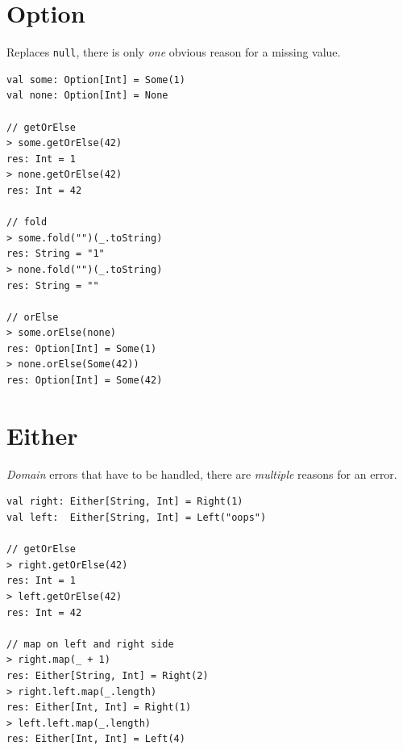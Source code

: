 \documentclass[10pt,landscape,a4paper]{article}
\begin{document}
\begin{multicols*}{4}
  \section{Option}
  \begin{mdframed}
    \footnotesize
    Replaces \texttt{null}, there is only \textit{one} obvious
    reason for a missing value.
  \end{mdframed}
  \begin{center}
  \end{center}
\begin{verbatim}
val some: Option[Int] = Some(1)
val none: Option[Int] = None

// getOrElse
> some.getOrElse(42)
res: Int = 1
> none.getOrElse(42)
res: Int = 42

// fold
> some.fold("")(_.toString)
res: String = "1"
> none.fold("")(_.toString)
res: String = ""

// orElse
> some.orElse(none)
res: Option[Int] = Some(1)
> none.orElse(Some(42))
res: Option[Int] = Some(42)

\end{verbatim}
  \section{Either}
  \begin{mdframed}
    \footnotesize
    \textit{Domain} errors that have to be handled, there are
    \textit{multiple} reasons for an error.
  \end{mdframed}
  \begin{center}
  \end{center}
\begin{verbatim}
val right: Either[String, Int] = Right(1)
val left:  Either[String, Int] = Left("oops")

// getOrElse
> right.getOrElse(42)
res: Int = 1
> left.getOrElse(42)
res: Int = 42

// map on left and right side
> right.map(_ + 1)
res: Either[String, Int] = Right(2)
> right.left.map(_.length)
res: Either[Int, Int] = Right(1)
> left.left.map(_.length)
res: Either[Int, Int] = Left(4)
\end{verbatim}

\end{multicols*}
\end{document}
